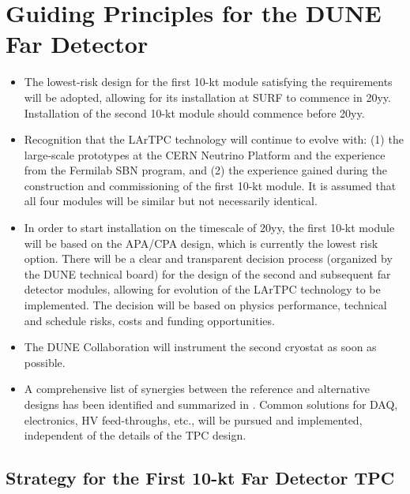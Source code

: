 \section{Guiding Principles for the DUNE Far Detector}

\begin{itemize}
\item The lowest-risk design for the first 10-kt module satisfying the requirements 
will be adopted, allowing for its installation at SURF to commence in 20yy. %
Installation  of the second 10-kt module should commence before 20yy. %

\item  Recognition that the LArTPC technology will continue to evolve with: (1) the 
large-scale prototypes at the CERN Neutrino Platform and the experience from the 
Fermilab SBN program, and (2) the experience gained during the construction and 
commissioning of the first 10-kt module. It is assumed that all four modules 
will be similar but not necessarily identical.

\item  In order to start installation on the timescale of 20yy, %
the first  10-kt module will be based on the APA/CPA design, which is currently the lowest
risk option. There will be a clear and transparent decision process (organized by the DUNE 
technical board) for the design 
of the second and subsequent far detector modules, allowing for evolution of the 
LArTPC technology to be implemented. The decision will be 
based on physics performance, technical and schedule risks, costs and funding 
opportunities.

\item The DUNE Collaboration will instrument the second cryostat as soon as possible.

\item A comprehensive list of synergies between the reference and alternative designs 
has been identified and summarized in \voldune. Common solutions for DAQ, 
electronics, HV feed-throughs, etc., will be pursued and implemented, independent 
of the details of the TPC design.

\end{itemize}

\subsection{Strategy for the First 10-kt Far Detector TPC}



